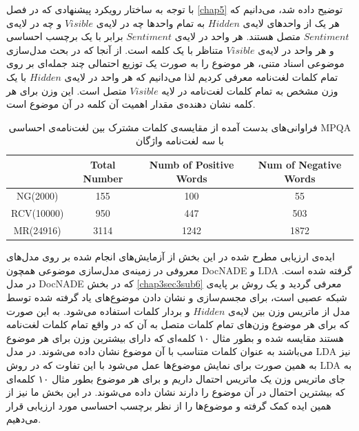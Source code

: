 با توجه به ساختار رویکرد پیشنهادی که در فصل
\ref{chap5}
توضیح داده شد، می‌‌دانیم که هر یک از واحدهای لایه‌ی
$Hidden$
به تمام واحدها چه در لایه‌ی
$Visible$
و چه در لایه‌ی
$Sentiment$
متصل هستند. هر واحد در لایه‌ی
$Sentiment$
برابر با یک برچسب احساسی‌ و هر واحد در لایه‌ی
$Visible$
متناظر با یک کلمه است. از آنجا که در بحث مدل‌سازی موضوعی اسناد متنی، هر موضوع را به صورت یک توزیع احتمالی چند جمله‌ای بر روی تمام کلمات لغت‌نامه معرفی‌ کردیم لذا می‌دانیم که هر واحد در لایه‌ی
$Hidden$
با یک وزن مشخص به تمام کلمات لغت‌نامه در لایه
$Visible$
متصل است. این وزن  برای هر کلمه نشان دهنده‌ی مقدار اهمیت آن کلمه در آن موضوع است.
\begin{table}[!t]
	\centering
	\begin{latin}
		\begin{tabular}{|c|c|c|c|}
			\hline
			& Total Number & Numb of Positive Words & Num of Negative Words \\ \hline
			NG(2000)  &     155      &          100           &          55           \\ \hline
			RCV(10000) &     950      &          447           &          503          \\ \hline
			MR(24916)  &     3114     &          1242          &         1872          \\ \hline
		\end{tabular}
	\end{latin}
	\caption{فراوانی‌های بدست آمده از مقایسه‌ی کلمات مشترک بین لغت‌نامه‌ی احساسی MPQA با سه لغت‌نامه واژگان}
	\label{chap5-tb3}
\end{table}
ایده‌ی ارزیابی مطرح شده در این بخش از آزمایش‌های انجام شده بر روی مدل‌های معروفی‌ در زمینه‌ی مدل‌سازی موضوعی همچون
DocNADE
و
LDA
گرفته شده است. در مدل
DocNADE
که در بخش 
\ref{chap3sec3sub6}
معرفی گردید و یک روش بر پایه‌ی شبکه عصبی است، برای مجسم‌سازی و نشان دادن موضوع‌های یاد گرفته شده توسط مدل از ماتریس وزن بین لایه‌ی
$Hidden$
و بردار کلمات استفاده می‌‌شود. به این صورت که برای هر موضوع وزن‌های تمام کلمات متصل به آن که در واقع تمام کلمات لغت‌نامه هستند مقایسه شده و بطور مثال ۱۰ کلمه‌ای‌ که دارای بیشترین وزن برای هر موضوع می‌‌باشند به عنوان کلمات متناسب با آن موضوع نشان داده می‌‌شوند. در مدل
LDA
نیز به همین صورت برای نمایش موضوع‌ها عمل می‌‌شود با این تفاوت که در روش
LDA
به جای ماتریس وزن یک ماتریس احتمال داریم و برای هر موضوع بطور مثال ۱۰ کلمه‌ای‌ که بیشترین احتمال در آن موضوع را دارند نشان داده می‌‌شوند.
در این بخش ما نیز از همین ایده کمک گرفته و موضوع‌ها را از نظر برچسب احساسی‌ مورد ارزیابی قرار می‌دهیم.

